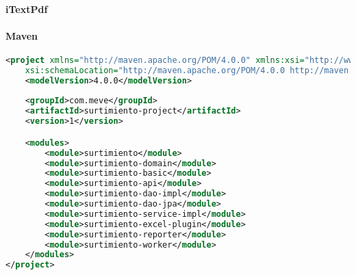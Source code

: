 \paragraph{iTextPdf}\cite{iTextInAction}

\paragraph{Maven}\cite{MasteringApacheMaven3}
\begin{lstlisting}[language=XML, caption={Proyecto padre de Maven}, label={lst:maven-parent-project}]
<project xmlns="http://maven.apache.org/POM/4.0.0" xmlns:xsi="http://www.w3.org/2001/XMLSchema-instance"
	xsi:schemaLocation="http://maven.apache.org/POM/4.0.0 http://maven.apache.org/xsd/maven-4.0.0.xsd">
	<modelVersion>4.0.0</modelVersion>
	
	<groupId>com.meve</groupId>
	<artifactId>surtimiento-project</artifactId>
	<version>1</version>

	<modules>
		<module>surtimiento</module>
		<module>surtimiento-domain</module>
		<module>surtimiento-basic</module>
		<module>surtimiento-api</module>
		<module>surtimiento-dao-impl</module>
		<module>surtimiento-dao-jpa</module>
		<module>surtimiento-service-impl</module>
		<module>surtimiento-excel-plugin</module>
		<module>surtimiento-reporter</module>
		<module>surtimiento-worker</module>
	</modules>
</project>
\end{lstlisting}

